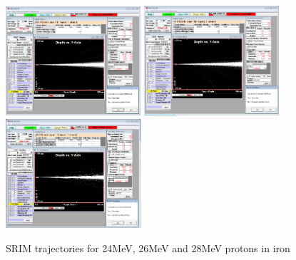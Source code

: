 \begin{figure}[!htb]
  \begin{center}
    \includegraphics[width=5.0cm]{appendix/srim_data/24MeV.png}
    \includegraphics[width=5.0cm]{appendix/srim_data/26MeV.png}
    \includegraphics[width=5.0cm]{appendix/srim_data/28MeV.png}
    \caption{SRIM trajectories for 24MeV, 26MeV and 28MeV protons in iron}
    \label{fig:srimiron-24-26-28}
  \end{center}
\end{figure}

